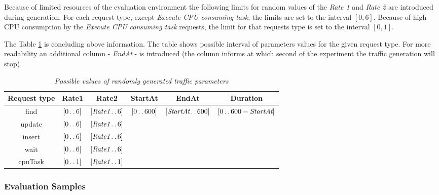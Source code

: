 \documentclass[12pt,a4paper]{article}
\begin{document}
Because of limited resources of the evaluation environment the following limits for random values of the \textit{Rate 1} and \textit{Rate 2} are introduced during generation.  For each request type, except \textit{Execute CPU consuming task}, the limits are set to the interval $[0,6]$. Because of high CPU consumption by the \textit{Execute CPU consuming task} requests, the limit for that requests type is set to the interval $[0,1]$. 

The Table \ref{table:random:traffic:possiblevalues} is concluding above information. The table shows possible interval of parameters values for the given request type. For more readability an additional column - \textit{EndAt} - is introduced (the column informs at which second of the experiment the traffic generation will stop). 

\newcommand{\twodots}{\mathinner {\ldotp \ldotp}}

\begin{table}[ht]

\begin{center}
\begin{tabular}{c|c|c|c|c|c}
\textbf{Request type}& \textbf{Rate1} & \textbf{Rate2} & \textbf{StartAt} & \textbf{EndAt} & \textbf{Duration} \\\hline
find	&$[0 \twodots 6]$    &$[\textit{Rate1} \twodots 6]$    &\multirow{5}{*}{$[0 \twodots 600]$}&\multirow{5}{*}{$[\textit{StartAt} \twodots 600]$}&\multirow{5}{*}{$[0 \twodots 600 -\textit{StartAt}]$}\\ \cline{1-3}
update	&$[0 \twodots 6]$    &$[\textit{Rate1} \twodots 6]$	  &	                     & 	                    \\ \cline{1-3}
insert	&$[0 \twodots 6]$    &$[\textit{Rate1} \twodots 6]$	  &	                     &                      \\ \cline{1-3}
wait	&$[0 \twodots 6]$    &$[\textit{Rate1} \twodots 6]$	  &	                     &                      \\ \cline{1-3}
cpuTask	&$[0 \twodots 1]$     &$[\textit{Rate1} \twodots 1]$     &	                     & 	                   \\  
\end{tabular}
\end{center}
\caption{\textit{Possible values of randomly generated traffic parameters}} \label{table:random:traffic:possiblevalues}
\end{table}


\subsubsection{Evaluation Samples}
\end{document}
